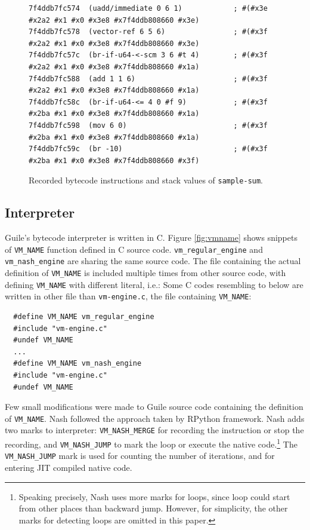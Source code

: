 \documentclass[preprint, numbers]{sigplanconf}
\begin{document}
\begin{figure}
  \centering
\begin{verbatim}
7f4ddb7fc574  (uadd/immediate 0 6 1)            ; #(#x3e #x2a2 #x1 #x0 #x3e8 #x7f4ddb808660 #x3e)
7f4ddb7fc578  (vector-ref 6 5 6)                ; #(#x3f #x2a2 #x1 #x0 #x3e8 #x7f4ddb808660 #x3e)
7f4ddb7fc57c  (br-if-u64-<-scm 3 6 #t 4)        ; #(#x3f #x2a2 #x1 #x0 #x3e8 #x7f4ddb808660 #x1a)
7f4ddb7fc588  (add 1 1 6)                       ; #(#x3f #x2a2 #x1 #x0 #x3e8 #x7f4ddb808660 #x1a)
7f4ddb7fc58c  (br-if-u64-<= 4 0 #f 9)           ; #(#x3f #x2ba #x1 #x0 #x3e8 #x7f4ddb808660 #x1a)
7f4ddb7fc598  (mov 6 0)                         ; #(#x3f #x2ba #x1 #x0 #x3e8 #x7f4ddb808660 #x1a)
7f4ddb7fc59c  (br -10)                          ; #(#x3f #x2ba #x1 #x0 #x3e8 #x7f4ddb808660 #x3f)
\end{verbatim}
\caption{Recorded bytecode instructions and stack values of
  \texttt{sample-sum}.}
\label{fig:trace}
\end{figure}

\subsection{Interpreter}
Guile's bytecode interpreter is written in C. Figure
\hyperref[fig:vmname]{\ref{fig:vmname}} shows snippets of \texttt{VM\_NAME}
function defined in C source code. \texttt{vm\_regular\_engine} and
\texttt{vm\_nash\_engine} are sharing the same source code. The file
containing the actual definition of \texttt{VM\_NAME} is included multiple
times from other source code, with defining \texttt{VM\_NAME} with different
literal, i.e.: Some C codes resembling to below are written in other file than
\texttt{vm-engine.c}, the file containing \texttt{VM\_NAME}:

\begin{verbatim}
  #define VM_NAME vm_regular_engine
  #include "vm-engine.c"
  #undef VM_NAME
  ...
  #define VM_NAME vm_nash_engine
  #include "vm-engine.c"
  #undef VM_NAME
\end{verbatim}

Few small modifications were made to Guile source code containing the
definition of \texttt{VM\_NAME}.  Nash followed the approach taken by
RPython\cite{bolz2009tracing} framework.  Nash adds two marks to interpreter:
\texttt{VM\_NASH\_MERGE} for recording the instruction or stop the recording,
and \texttt{VM\_NASH\_JUMP} to mark the loop or execute the native
code.\footnote{ Speaking precisely, Nash uses more marks for loops, since loop
  could start from other places than backward jump. However, for simplicity,
  the other marks for detecting loops are omitted in this paper.} The
\texttt{VM\_NASH\_JUMP} mark is used for counting the number of iterations,
and for entering JIT compiled native code.
\end{document}
